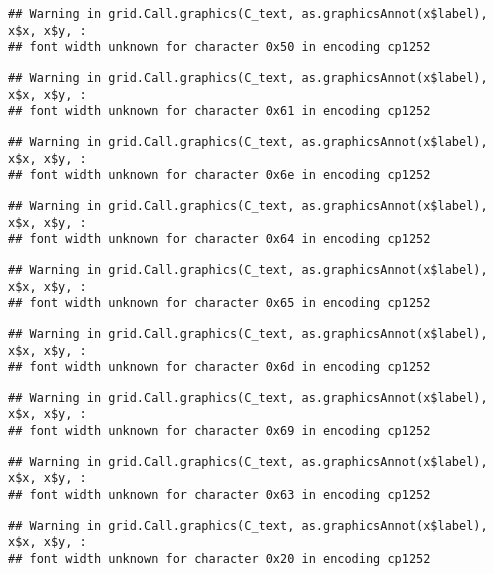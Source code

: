 \documentclass[
]{article}
\begin{document}
\begin{verbatim}
## Warning in grid.Call.graphics(C_text, as.graphicsAnnot(x$label), x$x, x$y, :
## font width unknown for character 0x50 in encoding cp1252
\end{verbatim}

\begin{verbatim}
## Warning in grid.Call.graphics(C_text, as.graphicsAnnot(x$label), x$x, x$y, :
## font width unknown for character 0x61 in encoding cp1252
\end{verbatim}

\begin{verbatim}
## Warning in grid.Call.graphics(C_text, as.graphicsAnnot(x$label), x$x, x$y, :
## font width unknown for character 0x6e in encoding cp1252
\end{verbatim}

\begin{verbatim}
## Warning in grid.Call.graphics(C_text, as.graphicsAnnot(x$label), x$x, x$y, :
## font width unknown for character 0x64 in encoding cp1252
\end{verbatim}

\begin{verbatim}
## Warning in grid.Call.graphics(C_text, as.graphicsAnnot(x$label), x$x, x$y, :
## font width unknown for character 0x65 in encoding cp1252
\end{verbatim}

\begin{verbatim}
## Warning in grid.Call.graphics(C_text, as.graphicsAnnot(x$label), x$x, x$y, :
## font width unknown for character 0x6d in encoding cp1252
\end{verbatim}

\begin{verbatim}
## Warning in grid.Call.graphics(C_text, as.graphicsAnnot(x$label), x$x, x$y, :
## font width unknown for character 0x69 in encoding cp1252
\end{verbatim}

\begin{verbatim}
## Warning in grid.Call.graphics(C_text, as.graphicsAnnot(x$label), x$x, x$y, :
## font width unknown for character 0x63 in encoding cp1252
\end{verbatim}

\begin{verbatim}
## Warning in grid.Call.graphics(C_text, as.graphicsAnnot(x$label), x$x, x$y, :
## font width unknown for character 0x20 in encoding cp1252
\end{verbatim}
\end{document}
